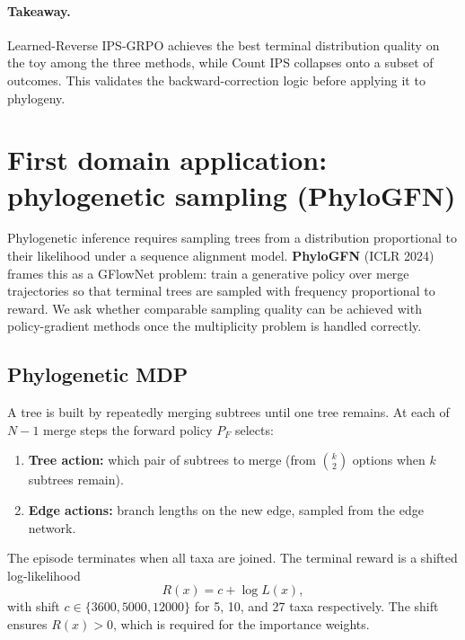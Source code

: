 \documentclass[11pt]{article}
\newcommand{\PF}{P_F}
\newcommand{\R}{R}
\begin{document}
\paragraph{Takeaway.}
Learned-Reverse IPS-GRPO achieves the best terminal distribution quality on the toy among the three methods, while Count IPS collapses onto a subset of outcomes. This validates the backward-correction logic before applying it to phylogeny.

\section{First domain application: phylogenetic sampling (PhyloGFN)}
\label{sec:phylo}

Phylogenetic inference requires sampling trees from a distribution proportional to their likelihood under a sequence alignment model. \textbf{PhyloGFN} (ICLR 2024) frames this as a GFlowNet problem: train a generative policy over merge trajectories so that terminal trees are sampled with frequency proportional to reward. We ask whether comparable sampling quality can be achieved with policy-gradient methods once the multiplicity problem is handled correctly.

\subsection{Phylogenetic MDP}

A tree is built by repeatedly merging subtrees until one tree remains. At each of \(N-1\) merge steps the forward policy \(\PF\) selects:
\begin{enumerate}
    \item \textbf{Tree action:} which pair of subtrees to merge (from \(\binom{k}{2}\) options when \(k\) subtrees remain).
    \item \textbf{Edge actions:} branch lengths on the new edge, sampled from the edge network.
\end{enumerate}
The episode terminates when all taxa are joined. The terminal reward is a shifted log-likelihood
\begin{equation}
    \R(x)=c+\log L(x),
\end{equation}
with shift \(c\in\{3600,5000,12000\}\) for 5, 10, and 27 taxa respectively. The shift ensures \(\R(x)>0\), which is required for the importance weights.
\end{document}
